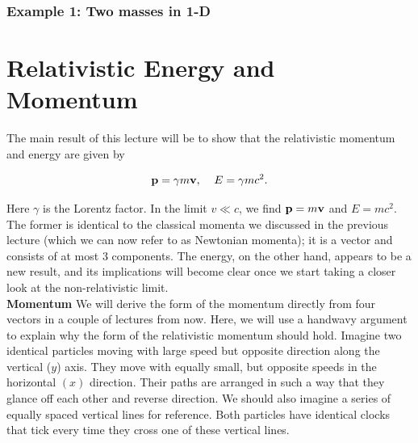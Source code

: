 \documentclass[12pt]{article}
\newcommand{\be}{\begin{eqnarray}}
\newcommand{\ee}{\end{eqnarray}}
\begin{document}
\subsubsection*{Example 1: Two masses in 1-D}


\section{Relativistic Energy and Momentum}

The main result of this lecture will be to show that the relativistic momentum and energy are given by 
\begin{tcolorbox}[colback=blue!5!white]
\vspace{-1.3em}
\be
{\bf p} = \gamma m{\bf v}, \;\;\;\; E = \gamma m c^2.
\ee
\end{tcolorbox}
Here $\gamma$ is the Lorentz factor. In the limit $v\ll c$, we find ${\bf p} = m{\bf v}$ and $E = mc^2$. The former is identical to the classical momenta we discussed in the previous lecture (which we can now refer to as Newtonian momenta); it is a vector and consists of at most $3$ components. The energy, on the other hand, appears to be a new result, and its implications will become clear once we start taking a closer look at the non-relativistic limit. \\


\noindent
{\bf Momentum} We will derive the form of the momentum directly from four vectors in a couple of lectures from now. Here, we will use a handwavy argument to explain why the form of the relativistic momentum should hold. Imagine two identical particles moving with large speed but opposite direction along the vertical ($y$) axis. They move with equally small, but opposite speeds in the horizontal $(x)$ direction. Their paths are arranged in such a way that they glance off each other and reverse direction. We should also imagine a series of equally spaced vertical lines for reference. Both particles have identical clocks that tick every time they cross one of these vertical lines. 
\end{document}

